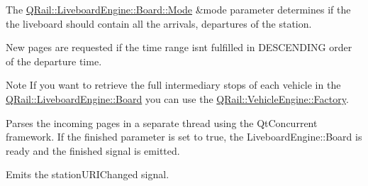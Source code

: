 The \mbox{\hyperlink{classQRail_1_1LiveboardEngine_1_1Board_a0ab6d318f405895f62c6e98cb2d86c6e}{Q\+Rail\+::\+Liveboard\+Engine\+::\+Board\+::\+Mode}} \&mode parameter determines if the the liveboard should contain all the arrivals, departures of the station.

New pages are requested if the time range isn\textquotesingle{}t fulfilled in D\+E\+S\+C\+E\+N\+D\+I\+NG order of the departure time.

\begin{DoxyNote}{Note}
If you want to retrieve the full intermediary stops of each vehicle in the \mbox{\hyperlink{classQRail_1_1LiveboardEngine_1_1Board}{Q\+Rail\+::\+Liveboard\+Engine\+::\+Board}} you can use the \mbox{\hyperlink{classQRail_1_1VehicleEngine_1_1Factory}{Q\+Rail\+::\+Vehicle\+Engine\+::\+Factory}}.
\end{DoxyNote}
Parses the incoming pages in a separate thread using the Qt\+Concurrent framework. If the finished parameter is set to true, the Liveboard\+Engine\+::\+Board is ready and the finished signal is emitted.

Emits the station\+U\+R\+I\+Changed signal. 